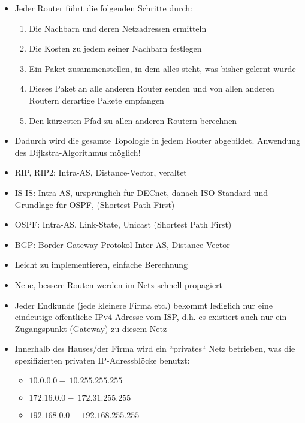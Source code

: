 \begin{itemize}
    \item Jeder Router führt die folgenden Schritte durch:
    \begin{enumerate}
        \item Die Nachbarn und deren Netzadressen ermitteln
        \item Die Kosten zu jedem seiner Nachbarn festlegen
        \item Ein Paket zusammenstellen, in dem alles steht, was bisher gelernt wurde
        \item Dieses Paket an alle anderen Router senden und von allen anderen Routern derartige Pakete empfangen
        \item Den kürzesten Pfad zu allen anderen Routern berechnen
    \end{enumerate}
    \item Dadurch wird die gesamte Topologie in jedem Router abgebildet.
    Anwendung des Dijkstra-Algorithmus möglich!
\end{itemize}

\begin{itemize}
    \item RIP, RIP2: Intra-AS, Distance-Vector, veraltet
    \item IS-IS: Intra-AS, ursprünglich für DECnet, danach ISO Standard und Grundlage für OSPF, (Shortest Path First)
    \item OSPF: Intra-AS, Link-State, Unicast (Shortest Path First)
    \item BGP: Border Gateway Protokol Inter-AS, Distance-Vector
\end{itemize}

\begin{itemize}
    \item Leicht zu implementieren, einfache Berechnung
    \item Neue, bessere Routen werden im Netz schnell propagiert
\end{itemize}

\begin{itemize}
    \item Jeder Endkunde (jede kleinere Firma etc.) bekommt lediglich nur eine eindeutige öffentliche IPv4 Adresse vom ISP, d.h. es existiert auch nur ein Zugangspunkt (Gateway) zu diesem Netz
    \item Innerhalb des Hauses/der Firma wird ein ``privates`` Netz betrieben, was die spezifizierten privaten IP-Adressblöcke benutzt:
    \begin{itemize}
        \item \( 10.0.0.0 -\: 10.255.255.255 \)
        \item \( 172.16.0.0 -\: 172.31.255.255 \)
        \item \( 192.168.0.0 -\: 192.168.255.255 \)
    \end{itemize}
\end{itemize}

